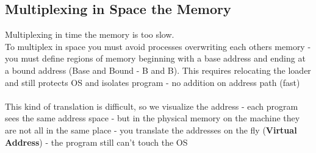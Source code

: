 \documentclass{article}
\begin{document}
\subsection{Multiplexing in Space the Memory}
Multiplexing in time the memory is too slow. \\
To multiplex in space you must avoid processes overwriting each others memory - you must define regions of memory beginning with a base address and ending at a bound address (Base and Bound - B and B). This requires relocating the loader and still protects OS and isolates program - no addition on address path (fast) \\ \\ 
This kind of translation is difficult, so we visualize the address - each program sees the same address space - but in the physical memory on the machine they are not all in the same place - you translate the addresses on the fly (\textbf{Virtual Address}) - the program still can't touch the OS
\end{document}
